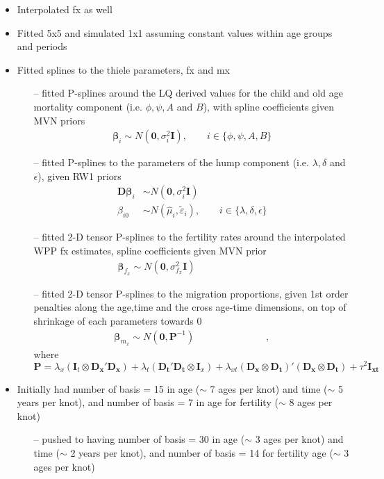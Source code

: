 \documentclass[12pt,a4paper]{article}
\date{\vspace{-5ex}}
\begin{document}
\begin{itemize}
\item Interpolated fx as well
\item Fitted 5x5 and simulated 1x1 assuming constant values within age groups and periods
\item Fitted splines to the thiele parameters, fx and mx
	\begin{itemize}
	\item[--] fitted P-splines around the LQ derived values for the child and old age mortality component (i.e. $\phi, \psi, A$ and $B$), with spline coefficients given MVN priors
	\begin{align*}
	\boldsymbol{\beta}_i \sim N(\boldsymbol{0}, \sigma^2_i \boldsymbol{I}), \qquad i \in \{ \phi, \psi, A, B \}
	\end{align*}
	\item[--] fitted P-splines to the parameters of the hump component (i.e. $\lambda, \delta$ and $\epsilon$), given RW1 priors
		\begin{align*}
	\boldsymbol{D \beta}_i &\sim N(\boldsymbol{0}, \sigma^2_i \boldsymbol{I})\\
	\beta_{i0} &\sim N(\hat{\mu}_i, \tilde{\varepsilon}_i), \qquad i \in \{\lambda, \delta, \epsilon\}
	\end{align*}
	\item[--] fitted 2-D tensor P-splines to the fertility rates around the interpolated WPP fx estimates, spline coefficients given MVN prior
	\begin{align*}
	\boldsymbol{\beta}_{f_x} \sim N(\boldsymbol{0}, \sigma^2_{f_x} \boldsymbol{I}) \phantom{, \qquad i \in \{\lambda, \delta, \epsilon\}}
	\end{align*}
	\item[--] fitted 2-D tensor P-splines to the migration proportions, given 1st order penalties along the age,time and the cross age-time dimensions, on top of shrinkage of each parameters towards 0
		\begin{align*}
	\boldsymbol{\beta}_{m_x} \sim N(\boldsymbol{0}, \boldsymbol{P}^{-1}) \phantom{, \qquad i \in \{\lambda, \delta, \epsilon\}},
	\end{align*}
	where $\boldsymbol{P} = \lambda_x (\boldsymbol{I}_t \otimes \boldsymbol{D_x'D_x}) + \lambda_t (\boldsymbol{D_t'D_t} \otimes \boldsymbol{I}_x) + \lambda_{xt} ( \boldsymbol{D_x \otimes D_t})'(\boldsymbol{D_x \otimes D_t}) + \tau^2 \boldsymbol{I_{xt}}$
	\end{itemize}
\item Initially had number of basis = 15 in age ($\sim$ 7 ages per knot) and time ($\sim$ 5 years per knot), and number of basis = 7 in age for fertility ($\sim$ 8 ages per knot)
	\begin{itemize}
	\item[--] pushed to having number of basis = 30 in age ($\sim$ 3 ages per knot) and time ($\sim$ 2 years per knot), and number of basis = 14 for fertility age ($\sim$ 3 ages per knot)
	\end{itemize}
	

\end{itemize}
\end{document}
